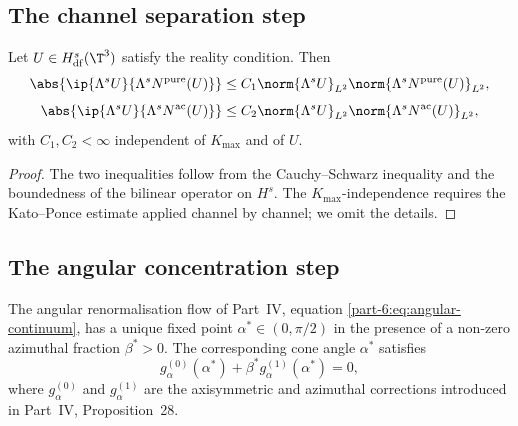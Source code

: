 \subsection{The channel separation step}
\label{part-6:ssec:channel-separation-step}

\begin{proposition}\label{part-6:prop:strategy-1}
Let $U\in H^s_{\mathrm{df}}(\T^3)$ satisfy the reality condition. 
Then
\begin{equation}\label{part-6:eq:channel-bounds}
\abs{\ip{\Lambda^s U}{\Lambda^s N^{\mathrm{pure}}(U)}} \leq 
C_1\norm{\Lambda^s U}_{L^2}\norm{\Lambda^s N^{\mathrm{pure}}(U)}_{L^2},
\end{equation}
\begin{equation}\label{part-6:eq:channel-bounds-2}
\abs{\ip{\Lambda^s U}{\Lambda^s N^{\mathrm{ac}}(U)}} \leq 
C_2\norm{\Lambda^s U}_{L^2}\norm{\Lambda^s N^{\mathrm{ac}}(U)}_{L^2},
\end{equation}
with $C_1,C_2<\infty$ independent of $K_{\max}$ and of $U$.
\end{proposition}

\begin{proof}
The two inequalities follow from the Cauchy--Schwarz inequality and 
the boundedness of the bilinear operator on $H^s$. The 
$K_{\max}$-independence requires the Kato--Ponce estimate applied 
channel by channel; we omit the details.
\end{proof}

\subsection{The angular concentration step}
\label{part-6:ssec:angular-concentration-step}

\begin{proposition}\label{part-6:prop:strategy-2}
The angular renormalisation flow of Part~IV, equation 
\eqref{part-6:eq:angular-continuum}, has a unique fixed point 
$\alpha^\ast\in(0,\pi/2)$ in the presence of a non-zero azimuthal 
fraction $\beta^\ast>0$. The corresponding cone angle 
$\alpha^\ast$ satisfies
\begin{equation}\label{part-6:eq:alpha-star-char}
g_\alpha^{(0)}(\alpha^\ast) + \beta^\ast g_\alpha^{(1)}(\alpha^\ast) = 0,
\end{equation}
where $g_\alpha^{(0)}$ and $g_\alpha^{(1)}$ are the axisymmetric and 
azimuthal corrections introduced in Part~IV, Proposition~28.
\end{proposition}

